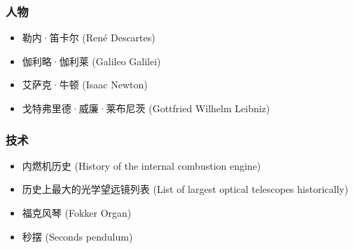 \subsubsection{人物}
\begin{itemize}
\item 勒内·笛卡尔 (René Descartes)
\item 伽利略·伽利莱 (Galileo Galilei)
\item 艾萨克·牛顿 (Isaac Newton)
\item 戈特弗里德·威廉·莱布尼茨 (Gottfried Wilhelm Leibniz)
\end{itemize}
\subsubsection{技术}
\begin{itemize}
\item 内燃机历史 (History of the internal combustion engine)
\item 历史上最大的光学望远镜列表 (List of largest optical telescopes historically)
\item 福克风琴 (Fokker Organ)
\item 秒摆 (Seconds pendulum)
\end{itemize}

